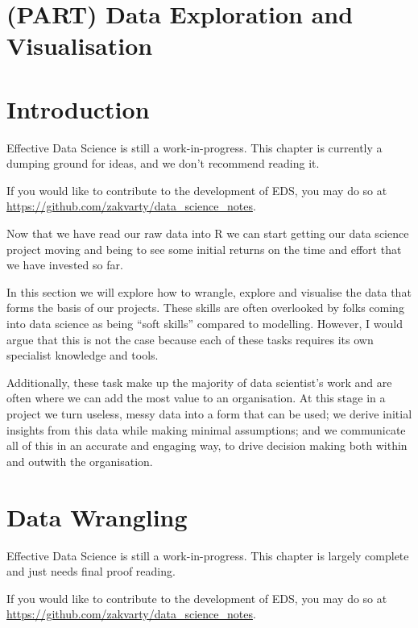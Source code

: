 \documentclass[
  12pt,
]{book}
\begin{document}
\hypertarget{part-data-exploration-and-visualisation}{%
\chapter{(PART) Data Exploration and Visualisation}\label{part-data-exploration-and-visualisation}}

\hypertarget{edav-introduction}{%
\chapter*{Introduction}\label{edav-introduction}}

Effective Data Science is still a work-in-progress. This chapter is currently a dumping ground for ideas, and we don't recommend reading it.

If you would like to contribute to the development of EDS, you may do so at \url{https://github.com/zakvarty/data_science_notes}.

Now that we have read our raw data into R we can start getting our data science project moving and being to see some initial returns on the time and effort that we have invested so far.

In this section we will explore how to wrangle, explore and visualise the data that forms the basis of our projects. These skills are often overlooked by folks coming into data science as being ``soft skills'' compared to modelling. However, I would argue that this is not the case because each of these tasks requires its own specialist knowledge and tools.

Additionally, these task make up the majority of data scientist's work and are often where we can add the most value to an organisation. At this stage in a project we turn useless, messy data into a form that can be used; we derive initial insights from this data while making minimal assumptions; and we communicate all of this in an accurate and engaging way, to drive decision making both within and outwith the organisation.

\hypertarget{edav-wrangling}{%
\chapter{Data Wrangling}\label{edav-wrangling}}

Effective Data Science is still a work-in-progress. This chapter is largely complete and just needs final proof reading.

If you would like to contribute to the development of EDS, you may do so at \url{https://github.com/zakvarty/data_science_notes}.
\end{document}
